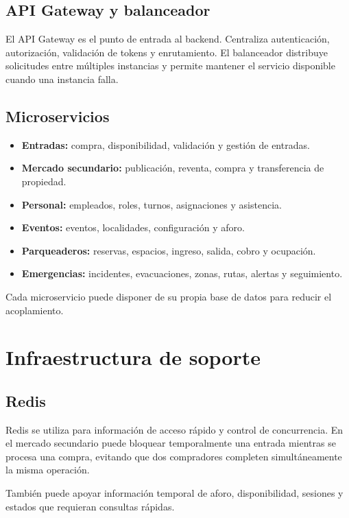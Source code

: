 \documentclass[12pt,a4paper]{article}
\begin{document}
\subsection{API Gateway y balanceador}

El API Gateway es el punto de entrada al backend. Centraliza autenticación, autorización, validación de tokens y enrutamiento. El balanceador distribuye solicitudes entre múltiples instancias y permite mantener el servicio disponible cuando una instancia falla.

\subsection{Microservicios}

\begin{itemize}
\item \textbf{Entradas:} compra, disponibilidad, validación y gestión de entradas.
\item \textbf{Mercado secundario:} publicación, reventa, compra y transferencia de propiedad.
\item \textbf{Personal:} empleados, roles, turnos, asignaciones y asistencia.
\item \textbf{Eventos:} eventos, localidades, configuración y aforo.
\item \textbf{Parqueaderos:} reservas, espacios, ingreso, salida, cobro y ocupación.
\item \textbf{Emergencias:} incidentes, evacuaciones, zonas, rutas, alertas y seguimiento.
\end{itemize}

Cada microservicio puede disponer de su propia base de datos para reducir el acoplamiento.

\section{Infraestructura de soporte}

\subsection{Redis}

Redis se utiliza para información de acceso rápido y control de concurrencia. En el mercado secundario puede bloquear temporalmente una entrada mientras se procesa una compra, evitando que dos compradores completen simultáneamente la misma operación.

También puede apoyar información temporal de aforo, disponibilidad, sesiones y estados que requieran consultas rápidas.
\end{document}
